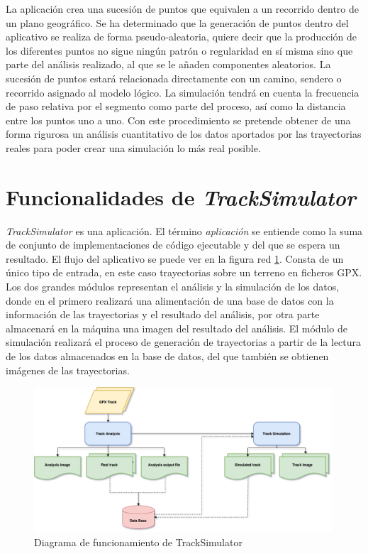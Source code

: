 La aplicación crea una sucesión de puntos que equivalen a un recorrido dentro de un plano geográfico. 
Se ha determinado que la generación de puntos dentro del aplicativo se realiza de forma pseudo-aleatoria, quiere decir que la producción de los diferentes puntos no sigue ningún patrón o regularidad en sí misma sino que parte del análisis realizado, al que se le añaden componentes aleatorios. La sucesión de puntos estará relacionada directamente con un camino, sendero o recorrido asignado al modelo lógico. La simulación tendrá en cuenta la frecuencia de paso relativa por el segmento como parte del proceso, así como la distancia entre los puntos uno a uno. Con este procedimiento se pretende obtener de una forma rigurosa un análisis cuantitativo de los datos aportados por las trayectorias reales para poder crear una simulación lo más real posible.

\section{Funcionalidades de \textit{TrackSimulator}}
\textit{TrackSimulator} es una aplicación. El término \textit{aplicación} se entiende como la suma de 
conjunto de implementaciones  de código ejecutable y del que se espera un resultado. El flujo del aplicativo se puede ver en la figura red \ref{figure:TrackSimulatorDiagramFlow}. Consta de un único tipo de entrada, en este caso trayectorias sobre un terreno en ficheros \ac{GPX}. Los dos grandes módulos representan el análisis y la simulación de los datos, donde en el primero realizará una alimentación de una base de datos con la información de las trayectorias y el resultado del análisis, por otra parte almacenará en la máquina una imagen del resultado del análisis. El módulo de simulación realizará el proceso de generación de trayectorias a partir de la lectura de los datos almacenados en la base de datos, del que también se obtienen imágenes de las trayectorias.

\begin{figure}[!htb]
\begin{center}
\includegraphics[width=0.99\textwidth]{./Imagenes/TrackSimulatorDiagram.png}
\caption{Diagrama de funcionamiento de TrackSimulator}
\label{figure:TrackSimulatorDiagramFlow}
\end{center}
\end{figure}

